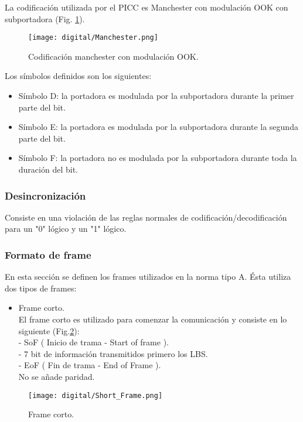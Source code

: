 La codificación utilizada por el PICC es Manchester con modulación OOK con subportadora (Fig. \ref{fig:Man}).

\begin{figure}[H]
\centering
\texttt{[image: digital/Manchester.png]}
\caption{Codificación manchester con modulación OOK.}
\label{fig:Man}
\end{figure}

Los símbolos definidos son los siguientes:
\begin{itemize}
\item Símbolo D: la portadora es modulada por la subportadora durante la primer parte del bit.
\item Símbolo E: la portadora es modulada por la subportadora durante la segunda parte del bit.
\item Símbolo F: la portadora no es modulada por la subportadora durante toda la duración del bit.
\end{itemize}

\subsubsection{Desincronización}
Consiste en una violación de las reglas normales de codificación/decodificación para un "0" lógico y un "1" lógico.


\subsubsection{Formato de frame}
En esta sección se definen los frames utilizados en la norma tipo A. 
Ésta utiliza dos tipos de frames:
\begin{itemize}
\item Frame corto.\\
El frame corto es utilizado para comenzar la comunicación y consiste en lo siguiente (Fig.\ref{fig:short_frame}):\\
- SoF ( Inicio de trama - Start of frame ).\\
- 7 bit de información transmitidos primero los LBS.\\
- EoF ( Fin de trama - End of Frame ).\\
No se añade paridad.
\end{itemize}

\begin{figure}[H]
\centering
\texttt{[image: digital/Short\_Frame.png]}
\caption{Frame corto.}
\label{fig:short_frame}
\end{figure}

